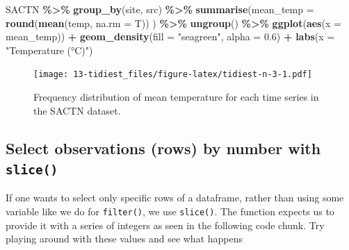 \documentclass[
]{book}
\newenvironment{Shaded}{\begin{snugshade}}{\end{snugshade}}
\newcommand{\DataTypeTok}[1]{\textcolor[rgb]{0.13,0.29,0.53}{#1}}
\newcommand{\FloatTok}[1]{\textcolor[rgb]{0.00,0.00,0.81}{#1}}
\newcommand{\KeywordTok}[1]{\textcolor[rgb]{0.13,0.29,0.53}{\textbf{#1}}}
\newcommand{\NormalTok}[1]{#1}
\newcommand{\OperatorTok}[1]{\textcolor[rgb]{0.81,0.36,0.00}{\textbf{#1}}}
\newcommand{\StringTok}[1]{\textcolor[rgb]{0.31,0.60,0.02}{#1}}
\begin{document}
\begin{Shaded}
\begin{Highlighting}[]
\NormalTok{SACTN }\OperatorTok{\%>\%}\StringTok{ }
\StringTok{  }\KeywordTok{group\_by}\NormalTok{(site, src) }\OperatorTok{\%>\%}\StringTok{ }
\StringTok{  }\KeywordTok{summarise}\NormalTok{(}\DataTypeTok{mean\_temp =} \KeywordTok{round}\NormalTok{(}\KeywordTok{mean}\NormalTok{(temp, }\DataTypeTok{na.rm =}\NormalTok{ T))}
\NormalTok{            ) }\OperatorTok{\%>\%}\StringTok{ }
\StringTok{  }\KeywordTok{ungroup}\NormalTok{() }\OperatorTok{\%>\%}\StringTok{ }
\StringTok{  }\KeywordTok{ggplot}\NormalTok{(}\KeywordTok{aes}\NormalTok{(}\DataTypeTok{x =}\NormalTok{ mean\_temp)) }\OperatorTok{+}
\StringTok{  }\KeywordTok{geom\_density}\NormalTok{(}\DataTypeTok{fill =} \StringTok{"seagreen"}\NormalTok{, }\DataTypeTok{alpha =} \FloatTok{0.6}\NormalTok{) }\OperatorTok{+}
\StringTok{  }\KeywordTok{labs}\NormalTok{(}\DataTypeTok{x =} \StringTok{"Temperature (°C)"}\NormalTok{)}
\end{Highlighting}
\end{Shaded}

\begin{figure}
\centering
\texttt{[image: 13-tidiest\_files/figure-latex/tidiest-n-3-1.pdf]}
\caption{\label{fig:tidiest-n-3}Frequency distribution of mean temperature for each time series in the SACTN dataset.}
\end{figure}

\hypertarget{select-observations-rows-by-number-with-slice}{%
\subsection{\texorpdfstring{Select observations (rows) by number with \texttt{slice()}}{Select observations (rows) by number with slice()}}\label{select-observations-rows-by-number-with-slice}}

If one wants to select only specific rows of a dataframe, rather than using some variable like we do for \texttt{filter()}, we use \texttt{slice()}. The function expects us to provide it with a series of integers as seen in the following code chunk. Try playing around with these values and see what happens
\end{document}
